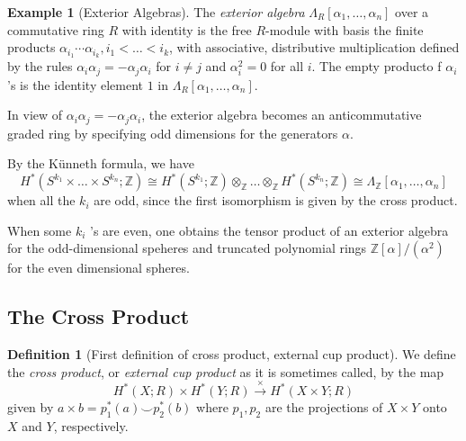 \documentclass[reqno]{amsart}
\theoremstyle{definition}
\newtheorem{definition}[theorem]{Definition}
\newtheorem{example}[theorem]{Example}
\theoremstyle{remark}
\begin{document}
    \begin{example}[Exterior Algebras]
        The \textit{exterior algebra}
        $\Lambda_R \left[ \alpha_1, \ldots, \alpha_n \right] $ 
        over a commutative ring $R$ with identity
        is the free $R$-module with basis
        the finite products
        $\alpha_{i_1} \cdots \alpha_{i_k},
        i_1 < \ldots < i_k$, with associative,
        distributive multiplication defined by
        the rules
        $\alpha_i \alpha_j = - \alpha_j \alpha_i$ for
        $i\neq j$ and
        $\alpha_i^2 = 0$ for all $i$.
        The empty producto f $\alpha_i$ 's is the identity
        element $1$ in
        $\Lambda_R \left[ \alpha_1, \ldots, \alpha_n \right] $.

        In view of
        $\alpha_i \alpha_j = - \alpha_j \alpha_i$,
        the exterior algebra becomes an
        anticommutative graded ring by specifying
        odd dimensions for the generators
        $\alpha$.

        By the Künneth formula, we have
        \[
        H^{*}\left( S^{k_1} \times 
        \ldots \times S^{k_n} ; \mathbb{Z}\right) 
        \cong
        H^{*}(S^{k_1} ; \mathbb{Z}) \otimes_{\mathbb{Z}} \ldots
        \otimes_{\mathbb{Z}} H^{*}(S^{k_n};\mathbb{Z})
        \cong \Lambda_{\mathbb{Z}}
        \left[ \alpha_1, \ldots, \alpha_n \right] 
        \] 
        when all the $k_i$ are odd,
        since the first isomorphism
        is given by the cross product.

        When some $k_i$ 's are even, one obtains
        the tensor product of an exterior algebra
        for the odd-dimensional speheres and truncated
        polynomial rings
        $\mathbb{Z} \left[ \alpha \right] /
        \left( \alpha^2 \right) $ for the even
        dimensional spheres.
    \end{example}

    \subsection{The Cross Product}
    
    \begin{definition}[First definition of cross product,
        external cup product]
        We define the \textit{cross product}, or
        \textit{external cup product} as it is
        sometimes called, by
        the map
        \[
        H^{*}(X;R) \times H^{*}(Y;R) \stackrel{\times }{\to} 
        H^{*}\left( X \times Y; R \right) 
        \] 
        given by
        $a \times b = p_1^{*}(a) \smile p_2^{*}(b)$ where
        $p_1, p_2$ are the projections of
        $X \times Y$ onto $X$ and $Y$, respectively.
    \end{definition}
\end{document}
